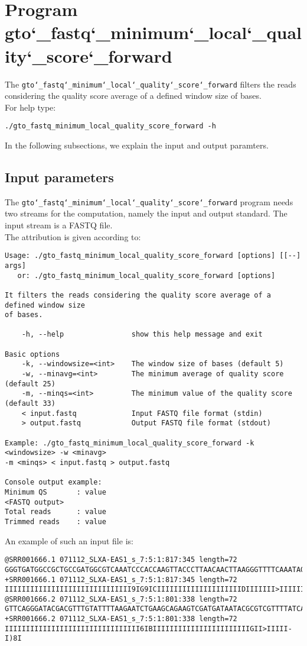 \section{Program gto\char`_fastq\char`_minimum\char`_local\char`_quality\char`_score\char`_forward}
The \texttt{gto\char`_fastq\char`_minimum\char`_local\char`_quality\char`_score\char`_forward} filters the reads considering the quality score average of a defined window size of bases.\\
For help type:
\begin{lstlisting}
./gto_fastq_minimum_local_quality_score_forward -h
\end{lstlisting}
In the following subsections, we explain the input and output paramters.

\subsection*{Input parameters}

The \texttt{gto\char`_fastq\char`_minimum\char`_local\char`_quality\char`_score\char`_forward} program needs two streams for the computation, namely the input and output standard. The input stream is a FASTQ file.\\
The attribution is given according to:
\begin{lstlisting}
Usage: ./gto_fastq_minimum_local_quality_score_forward [options] [[--] args]
   or: ./gto_fastq_minimum_local_quality_score_forward [options]

It filters the reads considering the quality score average of a defined window size 
of bases.

    -h, --help                show this help message and exit

Basic options
    -k, --windowsize=<int>    The window size of bases (default 5)
    -w, --minavg=<int>        The minimum average of quality score (default 25)
    -m, --minqs=<int>         The minimum value of the quality score (default 33)
    < input.fastq             Input FASTQ file format (stdin)
    > output.fastq            Output FASTQ file format (stdout)

Example: ./gto_fastq_minimum_local_quality_score_forward -k <windowsize> -w <minavg> 
-m <minqs> < input.fastq > output.fastq

Console output example:
Minimum QS       : value
<FASTQ output>
Total reads      : value
Trimmed reads    : value
\end{lstlisting}
An example of such an input file is:
\begin{lstlisting}
@SRR001666.1 071112_SLXA-EAS1_s_7:5:1:817:345 length=72
GGGTGATGGCCGCTGCCGATGGCGTCAAATCCCACCAAGTTACCCTTAACAACTTAAGGGTTTTCAAATAGA
+SRR001666.1 071112_SLXA-EAS1_s_7:5:1:817:345 length=72
IIIIIIIIIIIIIIIIIIIIIIIIIIIIII9IG9ICIIIIIIIIIIIIIIIIIIIIDIIIIIII>IIIIII/
@SRR001666.2 071112_SLXA-EAS1_s_7:5:1:801:338 length=72
GTTCAGGGATACGACGTTTGTATTTTAAGAATCTGAAGCAGAAGTCGATGATAATACGCGTCGTTTTATCAT
+SRR001666.2 071112_SLXA-EAS1_s_7:5:1:801:338 length=72
IIIIIIIIIIIIIIIIIIIIIIIIIIIIIIII6IBIIIIIIIIIIIIIIIIIIIIIIIGII>IIIII-I)8I
\end{lstlisting}

